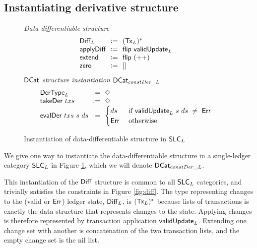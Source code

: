 \subsection{Instantiating derivative structure}

\begin{figure*}[htb]
  \emph{Data-differentiable structure}
  \begin{equation*}
    \begin{array}{l@{~\leteq~}l@{~~~~}lr}
      \Diff_L~&~\seqof{(\type{Tx}_L)} \\
      \fun{applyDiff}~&~\fun{flip}~\fun{validUpdate}_L \\
      \fun{extend} ~&~\fun{flip}~(++) \\
      \fun{zero}~&~[]
    \end{array}
  \end{equation*}
  \emph{$\mathsf{DCat}$ structure instantiation $\mathsf{DCat}_{constDer\_L}$}
  \begin{equation*}
    \begin{array}{l@{~\leteq~}l@{~~~~}lr}
      \type{DerType}_L~&~\Nt \\
      \fun{takeDer}~txs~&~\Nt \\
      \fun{evalDer}~txs~s~ds~&~\begin{cases}
        ds & \text{ if } \fun{validUpdate}_L~s~ds~\neq~\Err \\
        \Err & \text{ otherwise}
      \end{cases} \\
    \end{array}
  \end{equation*}
  \caption{Instantiation of data-differentiable structure in $\mathsf{SLC}_L$ }
  \label{fig:diff-cat-inst}
\end{figure*}

We give one way to instantiate the data-differentiable structure in a single-ledger
category $\mathsf{SLC}_L$ in Figure \ref{fig:diff-cat-inst}, which we will denote
$\mathsf{DCat}_{constDer\_L}$.

This instantiation of the $\mathsf{Diff}$ structure is common to all $\mathsf{SLC}_L$ categories,
and trivially satisfies the constraints in Figure \ref{fig:diff}.
The type representing
changes to the (valid or $\mathsf{Err}$) ledger state, $\mathsf{Diff}_L$, is $(\mathsf{Tx}_L)^{*}$
because lists of transactions is exactly the data structure that represents
changes to the state. Applying changes is therefore represented by transaction application
$\mathsf{validUpdate}_L$. Extending one change set with another is concatenation of
the two transaction lists, and the empty change set is the nil list.

